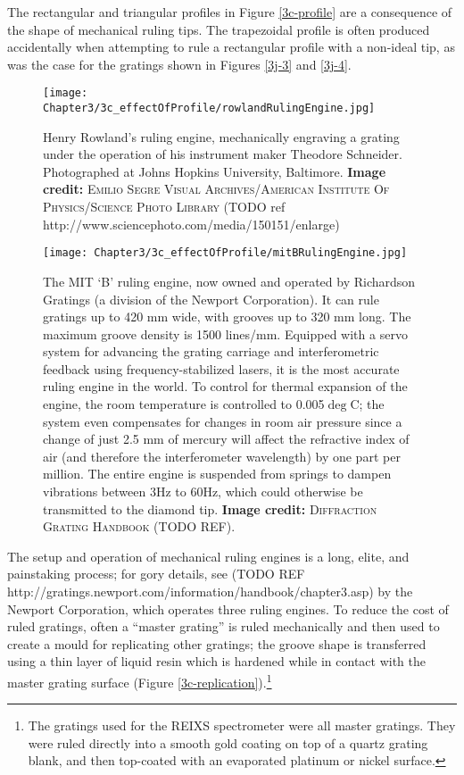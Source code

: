 The rectangular and triangular profiles in Figure \ref{3c-profile} are a consequence of the shape of mechanical ruling tips.  The trapezoidal profile is often produced accidentally when attempting to rule a rectangular profile with a non-ideal tip, as was the case for the gratings shown in Figures \ref{3j-3} and \ref{3j-4}.

\begin{figure}[htbp] %
   \centering
   \texttt{[image: Chapter3/3c\_effectOfProfile/rowlandRulingEngine.jpg]}
   \caption{Henry Rowland's ruling engine, mechanically engraving a grating under the operation of his instrument maker Theodore Schneider.  Photographed at Johns Hopkins University, Baltimore.  \textbf{Image credit: }\textsc{Emilio Segre Visual Archives/American Institute Of Physics/Science Photo Library} (TODO ref http://www.sciencephoto.com/media/150151/enlarge)}
   \label{3c-rowlandEngine}
\end{figure}

\begin{figure}[htbp] %
   \centering
   \texttt{[image: Chapter3/3c\_effectOfProfile/mitBRulingEngine.jpg]}
   \caption{The MIT `B' ruling engine, now owned and operated by Richardson Gratings (a division of the Newport Corporation).  It can rule gratings up to 420 mm wide, with grooves up to 320 mm long.  The maximum groove density is 1500 lines/mm.  Equipped with a servo system for advancing the grating carriage and interferometric feedback using frequency-stabilized lasers, it is the most accurate ruling engine in the world.  To control for thermal expansion of the engine, the room temperature is controlled to 0.005$\deg$C; the system even compensates for changes in room air pressure since a change of just 2.5 mm of mercury will affect the refractive index of air (and therefore the interferometer wavelength) by one part per million.  The entire engine is suspended from springs to dampen vibrations between 3Hz to 60Hz, which could otherwise be transmitted to the diamond tip.  \textbf{Image credit: }\textsc{Diffraction Grating Handbook} (TODO REF).}
   \label{3c-mitBEngine}
\end{figure}

The setup and operation of mechanical ruling engines is a long, elite, and painstaking process; for gory details, see (TODO REF http://gratings.newport.com/information/handbook/chapter3.asp) by the Newport Corporation, which operates three ruling engines.  To reduce the cost of ruled gratings, often a ``master grating'' is ruled mechanically and then used to create a mould for replicating other gratings; the groove shape is transferred using a thin layer of liquid resin which is hardened while in contact with the master grating surface (Figure \ref{3c-replication}).\footnote{The gratings used for the REIXS spectrometer were all master gratings. They were ruled directly into a smooth gold coating on top of a quartz grating blank, and then top-coated with an evaporated platinum or nickel surface.}

